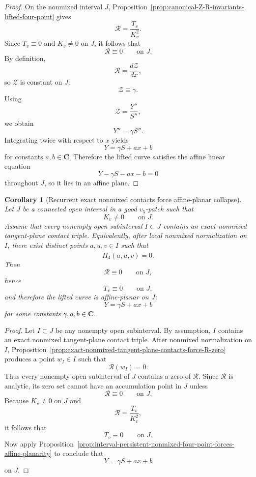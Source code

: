 \documentclass[11pt,a4paper]{amsart}
\theoremstyle{plain}
\newtheorem{corollary}[theorem]{Corollary}
\theoremstyle{definition}
\begin{document}
\begin{proof}
On the nonmixed interval $J$, Proposition~\ref{prop:canonical-Z-R-invariants-lifted-four-point}
gives
\[
\mathcal R=\frac{T_v}{K_v^2}.
\]
Since $T_v\equiv 0$ and $K_v\neq 0$ on $J$, it follows that
\[
\mathcal R\equiv 0
\qquad\text{on }J.
\]
By definition,
\[
\mathcal R=\frac{d\mathcal Z}{dx},
\]
so $\mathcal Z$ is constant on $J$:
\[
\mathcal Z\equiv \gamma.
\]
Using
\[
\mathcal Z=\frac{Y''}{S''},
\]
we obtain
\[
Y''=\gamma S''.
\]
Integrating twice with respect to $x$ yields
\[
Y=\gamma S+ax+b
\]
for constants $a,b\in\mathbf C$. Therefore the lifted curve satisfies the
affine linear equation
\[
Y-\gamma S-ax-b=0
\]
throughout $J$, so it lies in an affine plane.
\end{proof}

\begin{corollary}[Recurrent exact nonmixed contacts force affine-planar collapse]
\label{cor:recurrent-exact-nonmixed-contacts-force-affine-planarity}
Let $J$ be a connected open interval in a good $v_5$-patch such that
\[
K_v\neq 0
\qquad\text{on }J.
\]
Assume that every nonempty open subinterval $I\subset J$ contains an exact
nonmixed tangent-plane contact triple. Equivalently, after local nonmixed
normalization on $I$, there exist distinct points $a,u,v\in I$ such that
\[
\widetilde H_4(a,u,v)=0.
\]
Then
\[
\mathcal R\equiv 0
\qquad\text{on }J,
\]
hence
\[
T_v\equiv 0
\qquad\text{on }J,
\]
and therefore the lifted curve is affine-planar on $J$:
\[
Y=\gamma S+ax+b
\]
for some constants $\gamma,a,b\in\mathbf C$.
\end{corollary}

\begin{proof}
Let $I\subset J$ be any nonempty open subinterval. By assumption, $I$
contains an exact nonmixed tangent-plane contact triple. After nonmixed
normalization on $I$, Proposition~\ref{prop:exact-nonmixed-tangent-plane-contacts-force-R-zero}
produces a point $w_I\in I$ such that
\[
\mathcal R(w_I)=0.
\]
Thus every nonempty open subinterval of $J$ contains a zero of $\mathcal R$.
Since $\mathcal R$ is analytic, its zero set cannot have an accumulation point
in $J$ unless
\[
\mathcal R\equiv 0
\qquad\text{on }J.
\]
Because $K_v\neq 0$ on $J$ and
\[
\mathcal R=\frac{T_v}{K_v^2},
\]
it follows that
\[
T_v\equiv 0
\qquad\text{on }J.
\]
Now apply
Proposition~\ref{prop:interval-persistent-nonmixed-four-point-forces-affine-planarity}
to conclude that
\[
Y=\gamma S+ax+b
\]
on $J$.
\end{proof}
\end{document}
